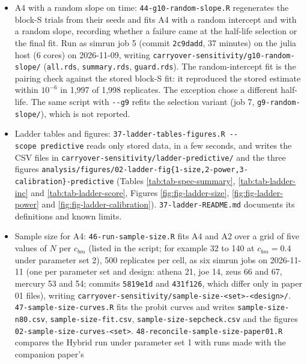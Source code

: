 \documentclass[
  11pt,
]{article}
\begin{document}
\begin{itemize}
  it reproduces the stored fit, which held in
  54,989 of 55,000 replicates (\texttt{guard.rds}).
\item
  A4 with a random slope on time: \texttt{44-g10-random-slope.R}
  regenerates the block-S trials from their seeds and fits A4 with a
  random intercept and with a random slope, recording whether a
  failure came at the half-life selection or the final fit. Run as
  simrun job 5 (commit \texttt{2c9dadd}, 37 minutes) on the julia host (6
  cores) on 2026-11-09, writing \texttt{carryover-sensitivity/g10-random-slope/}
  (\texttt{all.rds}, \texttt{summary.rds}, \texttt{guard.rds}). The random-intercept fit is
  the pairing check against the stored block-S fit: it reproduced the
  stored estimate within \(10^{-6}\) in
  1,997 of 1,998 replicates. The exception chose a different
  half-life. The same script with
  \texttt{-\/-g9} refits the selection variant (job 7, \texttt{g9-random-slope/}),
  which is not reported.
\item
  Ladder tables and figures: \texttt{37-ladder-tables-figures.R\ -\/-scope\ predictive} reads only stored data, in a few seconds, and writes the
  CSV files in \texttt{carryover-sensitivity/ladder-predictive/} and the three
  figures
  \texttt{analysis/figures/02-ladder-fig\{1-size,2-power,3-calibration\}-predictive}
  (Tables \ref{tab:tab-spec-summary}, \ref{tab:tab-ladder-inc} and
  \ref{tab:tab-ladder-score}, Figures \ref{fig:fig-ladder-size},
  \ref{fig:fig-ladder-power} and \ref{fig:fig-ladder-calibration}).
  \texttt{37-ladder-README.md} documents its definitions and known limits.
\item
  Sample size for A4: \texttt{46-run-sample-size.R} fits A4 and A2 over a
  grid of five values of \(N\) per \(c_{bm}\) (listed in the script; for
  example 32 to 140 at \(c_{bm} = 0.4\) under parameter set 2), 500
  replicates per cell, as six
  simrun jobs on 2026-11-11 (one per parameter set and design: athena
  21, joe 14, zeus 66 and 67, mercury 53 and 54; commits \texttt{5819e1d} and
  \texttt{431f126}, which differ only in paper 01 files), writing
  \texttt{carryover-sensitivity/sample-size-\textless{}set\textgreater{}-\textless{}design\textgreater{}/}.
  \texttt{47-sample-size-curves.R} fits the probit curves and writes
  \texttt{sample-size-n80.csv}, \texttt{sample-size-fit.csv},
  \texttt{sample-size-sepcheck.csv} and the figures
  \texttt{02-sample-size-curves-\textless{}set\textgreater{}}.
  \texttt{48-reconcile-sample-size-paper01.R} compares the Hybrid run under
  parameter set 1 with runs made with the companion paper's

\end{itemize}
\end{document}
